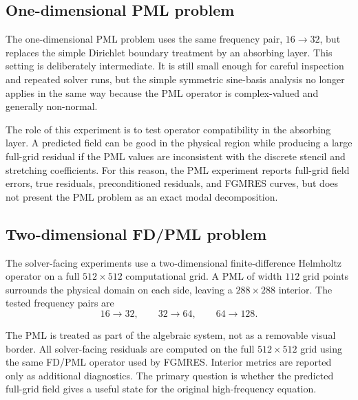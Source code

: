 \subsection{One-dimensional PML problem}
\label{subsec:setup-1d-pml}

The one-dimensional PML problem uses the same frequency pair, $16\to32$, but
replaces the simple Dirichlet boundary treatment by an absorbing layer. This
setting is deliberately intermediate. It is still small enough for careful
inspection and repeated solver runs, but the simple symmetric sine-basis
analysis no longer applies in the same way because the PML operator is
complex-valued and generally non-normal.

The role of this experiment is to test operator compatibility in the absorbing
layer. A predicted field can be good in the physical region while producing a
large full-grid residual if the PML values are inconsistent with the discrete
stencil and stretching coefficients. For this reason, the PML experiment
reports full-grid field errors, true residuals, preconditioned residuals, and
FGMRES curves, but does not present the PML problem as an exact modal
decomposition.

\subsection{Two-dimensional FD/PML problem}
\label{subsec:setup-2d-fd-pml}

The solver-facing experiments use a two-dimensional finite-difference
Helmholtz operator on a full $512\times512$ computational grid. A PML of width
$112$ grid points surrounds the physical domain on each side, leaving a
$288\times288$ interior. The tested frequency pairs are
\begin{equation}
    16\to32,
    \qquad
    32\to64,
    \qquad
    64\to128.
    \label{eq:setup-2d-pairs}
\end{equation}

The PML is treated as part of the algebraic system, not as a removable visual
border. All solver-facing residuals are computed on the full $512\times512$
grid using the same FD/PML operator used by FGMRES. Interior metrics are
reported only as additional diagnostics. The primary question is whether the
predicted full-grid field gives a useful state for the original
high-frequency equation.

